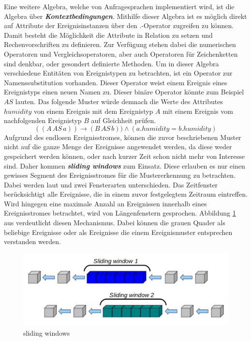 \documentclass{acm_proc_article-sp}
\begin{document}
Eine weitere Algebra, welche von Anfragesprachen implementiert wird, ist die Algebra über 
\textbf{\textit{Kontextbedingungen}}. Mithilfe dieser Algebra ist es möglich direkt 
auf Attribute der Ereignisinstanzen über den $.$-Operator zugreifen zu können. Damit 
besteht die Möglichkeit die Attribute in Relation zu setzen und Rechenvorschriften zu 
definieren. Zur Verfügung stehen dabei die numerischen Operatoren und 
Vergleichsoperatoren, aber auch Operatoren für Zeichenketten sind denkbar, oder gesondert 
definierte Methoden. Um in dieser Algebra verschiedene Entitäten von Ereignistypen zu 
betrachten, ist ein Operator zur Namenssubstitution vorhanden. Dieser Operator weist 
einem Ereignis eines Ereignistyps einen neuen Namen zu. Dieser binäre Operator könnte zum 
Beispiel $AS$ lauten. Das folgende Muster würde demnach die Werte des Attributes 
$humidity$ von einem Ereignis mit dem Ereignistyp $A$ mit einem Ereignis vom 
nachfolgenden Ereignistyp $B$ auf Gleichheit prüfen.
$$((A\, AS\, a)) \rightarrow (B\, AS\, b)) \land (a.humidity = b.humidity)$$
Aufgrund des endlosen Ereignisstromes, können die zuvor beschriebenen Muster nicht auf 
die ganze Menge der Ereignisse angewendet werden, da diese weder gespeichert werden 
können, oder nach kurzer Zeit schon nicht mehr von Interesse sind. Daher kommen 
\textbf{\textit{sliding windows}} zum Einsatz. Diese erlauben es nur einen 
gewisses Segment des Ereignisstromes für die Mustererkennung zu betrachten. Dabei werden 
laut \cite{bruns} und \cite{hedtstuck} zwei Fensterarten unterschieden. Das Zeitfenster 
berücksichtigt alle Ereignisse, die in einem zuvor festgelegtem Zeitraum eintreffen. 
Wird hingegen eine maximale Anzahl an Ereignissen innerhalb eines 
Ereignisstromes betrachtet, wird von Längenfenstern gesprochen. Abbildung 
\ref{img:sliding-windows} aus \cite{drools-slide} verdeutlicht diesen Mechanismus. Dabei 
können die grauen Quader als beliebige Ereignisse oder als Ereignisse die einem 
Ereignismuster entsprechen verstanden werden.

\begin{figure}[H]
    \centering
    \includegraphics[width=\linewidth]{img/sliding-windows.png}
    \caption{sliding windows}
    \label{img:sliding-windows}
\end{figure}
\end{document}
